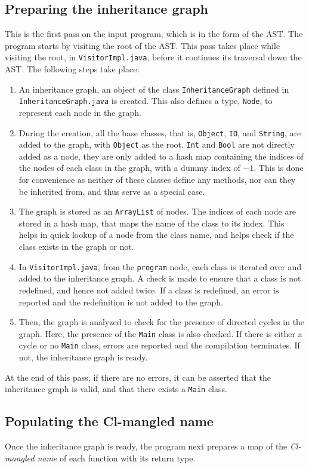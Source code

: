 \documentclass{article}
\begin{document}
\subsection{Preparing the inheritance graph}
This is the first pass on the input program, which is in the form of the AST. The program starts by visiting the root of the AST. This pass takes place while visiting the root, in \verb|VisitorImpl.java|, before it continues its traversal down the AST. The following steps take place:
\begin{enumerate}
	\item An inheritance graph, an object of the class \verb|InheritanceGraph| defined in \verb|InheritanceGraph.java| is created. This also defines a type, \verb|Node|, to represent each node in the graph.
	\item During the creation, all the base classes, that is, \verb|Object|, \verb|IO|, and \verb|String|, are added to the graph, with \verb|Object| as the root. \verb|Int| and \verb|Bool| are not directly added as a node, they are only added to a hash map containing the indices of the nodes of each class in the graph, with a dummy index of $-1$. This is done for convenience as neither of these classes define any methods, nor can they be inherited from, and thus serve as a special case.
	\item The graph is stored as an \verb|ArrayList| of nodes. The indices of each node are stored in a hash map, that maps the name of the class to its index. This helps in quick lookup of a node from the class name, and helps check if the class exists in the graph or not.
	\item In \verb|VisitorImpl.java|, from the \verb|program| node, each class is iterated over and added to the inheritance graph. A check is made to ensure that a class is not redefined, and hence not added twice. If a class is redefined, an error is reported and the redefinition is not added to the graph.
	\item Then, the graph is analyzed to check for the presence of directed cycles in the graph. Here, the presence of the \verb|Main| class is also checked. If there is either a cycle or no \verb|Main| class, errors are reported and the compilation terminates. If not, the inheritance graph is ready.
\end{enumerate}
At the end of this pass, if there are no errors, it can be asserted that the inheritance graph is valid, and that there exists a \verb|Main| class. 

\subsection{Populating the Cl-mangled name}
Once the inheritance graph is ready, the program next prepares a map of the \textit{Cl-mangled name} of each function with its return type.
\end{document}
